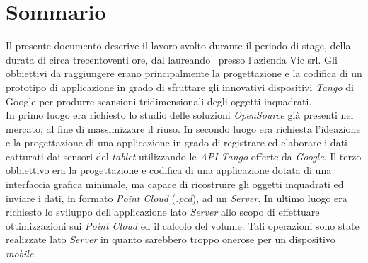 
\cleardoublepage
{}
{}
\begingroup
\let\clearpage\relax
\let\cleardoublepage\relax
\let\cleardoublepage\relax

\chapter*{Sommario}

Il presente documento descrive il lavoro svolto durante il periodo di stage, della durata di circa trecentoventi ore, dal laureando \myName \ presso l'azienda Vic srl.
Gli obbiettivi da raggiungere erano principalmente la progettazione e la codifica di un prototipo di applicazione in grado di sfruttare gli innovativi dispositivi \emph{Tango} di Google per produrre scansioni tridimensionali degli oggetti inquadrati.\\
In primo luogo era richiesto lo studio delle soluzioni \emph{OpenSource} già presenti nel mercato, al fine di massimizzare il riuso.
In secondo luogo era richiesta l'ideazione e la progettazione di una applicazione in grado di registrare ed elaborare i dati catturati dai sensori del \emph{tablet} utilizzando le \emph{API Tango} offerte da \emph{Google}. 
Il terzo obbiettivo era la progettazione e codifica di una applicazione dotata di una interfaccia grafica minimale, ma capace di ricostruire gli oggetti inquadrati ed inviare i dati, in formato \emph{Point Cloud} (\emph{.pcd}), ad un \emph{Server}.
In ultimo luogo era richiesto lo sviluppo dell'applicazione lato \emph{Server} allo scopo di effettuare ottimizzazioni sui \emph{Point Cloud} ed il calcolo del volume. Tali operazioni sono state realizzate lato \emph{Server} in quanto sarebbero troppo onerose per un dispositivo \emph{mobile}.

%
%

\endgroup			

\vfill

